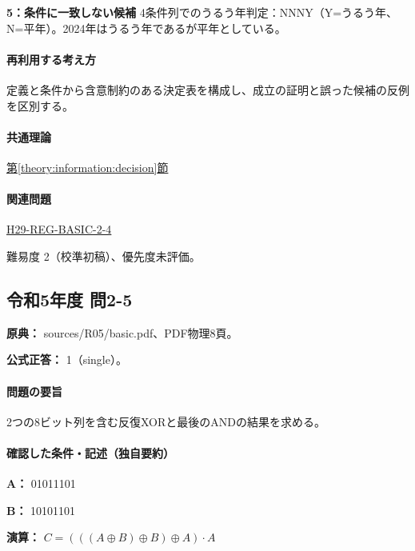 \noindent\textbf{5：条件に一致しない候補} 4条件列でのうるう年判定：NNNY（Y=うるう年、N=平年）。2024年はうるう年であるが平年としている。\par

\paragraph{再利用する考え方} 定義と条件から含意制約のある決定表を構成し、成立の証明と誤った候補の反例を区別する。

\paragraph{共通理論} \hyperref[theory:information:decision]{第\ref*{theory:information:decision}節}

\paragraph{関連問題} \hyperref[q:h29-reg-basic-2-4]{H29-REG-BASIC-2-4}

\par 難易度 2（校準初稿）、優先度未評価。

\subsection{令和5年度 問2-5}
\label{q:r05-reg-basic-2-5}

\noindent\textbf{原典：} sources/R05/basic.pdf、PDF物理8頁。

\textbf{公式正答：} 1（single）。

\paragraph{問題の要旨} 2つの8ビット列を含む反復XORと最後のANDの結果を求める。

\paragraph{確認した条件・記述（独自要約）}\mbox{}\par

\noindent\textbf{A：} 01011101\par

\noindent\textbf{B：} 10101101\par

\noindent\textbf{演算：} \(C=(((A\oplus B)\oplus B)\oplus A)\cdot A\)\par

